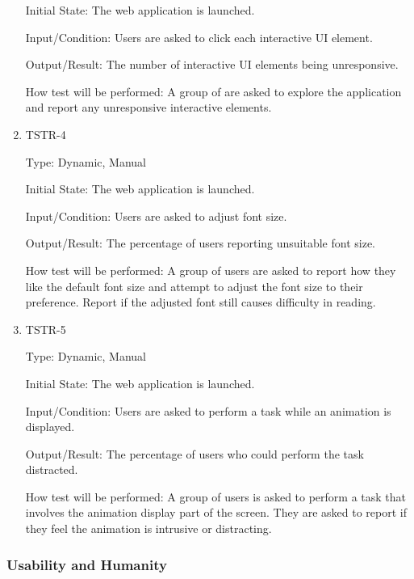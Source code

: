 \documentclass[12pt, titlepage]{article}
\begin{document}
\begin{enumerate}
Initial State: The web application is launched.
					
Input/Condition: Users are asked to click each interactive UI element.
					
Output/Result: The number of interactive UI elements being unresponsive.
					
How test will be performed: A group of are asked to explore the application and report any unresponsive interactive elements.

\item{TSTR-4\\}

Type: Dynamic, Manual
					
Initial State: The web application is launched.
					
Input/Condition: Users are asked to adjust font size.
					
Output/Result: The percentage of users reporting unsuitable font size.
					
How test will be performed: A group of users are asked to report how they like the default font size and attempt to adjust the font size to their preference. Report if the adjusted font still causes difficulty in reading.

\item{TSTR-5\\}

Type: Dynamic, Manual
					
Initial State: The web application is launched.
					
Input/Condition: Users are asked to perform a task while an animation is displayed.
					
Output/Result: The percentage of users who could perform the task distracted.
					
How test will be performed: A group of users is asked to perform a task that involves the animation display part of the screen.  They are asked to report if they feel the animation is intrusive or distracting.
\end{enumerate}

\subsubsection{Usability and Humanity}
\end{document}
